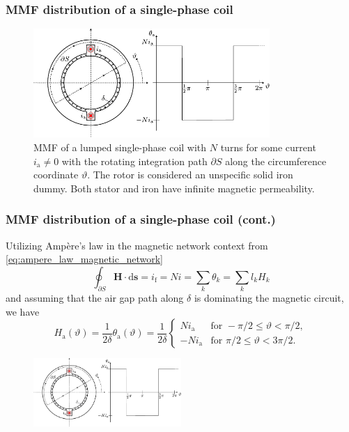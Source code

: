 \begin{frame}
	\frametitle{MMF distribution of a single-phase coil}
    \begin{figure}
            \centering
            \includegraphics[width=0.8\textwidth]{fig/lec05/MMF_single_phase.pdf}
            \caption{MMF of a lumped single-phase coil with $N$ turns for some current $i_\mathrm{a} \neq 0$ with the rotating integration path $\partial S$  along the circumference coordinate $\vartheta$. The rotor is considered an unspecific solid iron dummy. Both stator and iron have infinite magnetic permeability.}
            \label{fig: MMF_single_phase}
    \end{figure}
\end{frame}

\begin{frame}
	\frametitle{MMF distribution of a single-phase coil (cont.)}
			Utilizing Amp\`ere's law in the magnetic network context from \eqref{eq:ampere_law_magnetic_network}
            $$ \oint_{\partial S} \bm{H} \cdot \mathrm{d}\bm{s} = i_{\mathrm{f}} = N i = \sum_k  \theta_k = \sum_k l_k H_k $$ 
            and assuming that the air gap path along $\delta$ is dominating the magnetic circuit, we have
            \begin{equation}
                H_\mathrm{a}(\vartheta) = \frac{1}{2\delta} \theta_\mathrm{a}(\vartheta) = \frac{1}{2\delta} \begin{cases}
                    N i_\mathrm{a} & \text{for } -\pi/2 \leq \vartheta < \pi/2, \\
                    -N i_\mathrm{a} & \text{for } \pi/2 \leq \vartheta < 3\pi/2.
                \end{cases}
            \end{equation}
            \begin{figure}
                \centering
                \includegraphics[width=0.5\textwidth]{fig/lec05/MMF_single_phase.pdf}
            \end{figure}
\end{frame}

